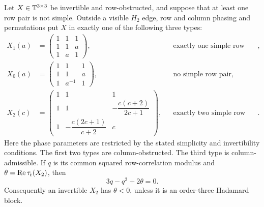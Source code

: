 \begin{lemma}
\label{lem:supp-repeated-ratio-trichotomy}
{Let $X\in\mathbb T^{3\times3}$ be invertible and row-obstructed, and suppose that at least one row pair is not simple.  Outside a visible $H_2$ edge, row and column phasing and permutations put $X$ in exactly one of the following three types:}
\begin{align}
{X_1(a)}&{=\begin{pmatrix}1&1&1\\1&1&a\\1&a&1\end{pmatrix},}
&&{\text{exactly one simple row pair},}
\label{eq:supp-one-simple-normal-form}\\
{X_0(a)}&{=\begin{pmatrix}1&1&1\\1&1&a\\1&a^{-1}&1\end{pmatrix},}
&&{\text{no simple row pair},}
\label{eq:supp-no-simple-normal-form}\\
{X_2(c)}&{=\begin{pmatrix}
1&1&1\\
1&1&-\dfrac{c(c+2)}{2c+1}\\
1&-\dfrac{c(2c+1)}{c+2}&c
\end{pmatrix},}
&&{\text{exactly two simple row pairs}.}
\label{eq:supp-two-simple-normal-form}
\end{align}
{Here the phase parameters are restricted by the stated simplicity and invertibility conditions.  The first two types are column-obstructed.  The third type is column-admissible. If $q$ is its common squared row-correlation modulus and $\theta=\operatorname{Re}\tau_{\rm r}(X_2)$, then}
\begin{equation}
{3q-q^2+2\theta=0.}
\label{eq:supp-two-simple-negative-invariant}
\end{equation}
{Consequently an invertible $X_2$ has $\theta<0$, unless it is an order-three Hadamard block.}
\end{lemma}

